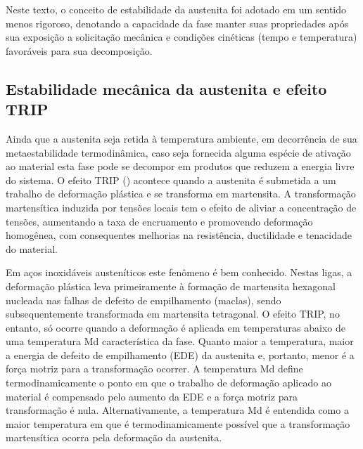 Neste texto, o conceito de estabilidade da austenita foi adotado em um sentido menos rigoroso, denotando a capacidade da fase manter suas propriedades após sua exposição a solicitação mecânica e condições cinéticas (tempo e temperatura) favoráveis para sua decomposição.


\subsection{Estabilidade mecânica da austenita e efeito TRIP}

\label{subsec:TRIP}

Ainda que a austenita seja retida à temperatura ambiente, em decorrência de sua metaestabilidade termodinâmica, caso seja fornecida alguma espécie de ativação ao material esta fase pode se decompor em produtos que reduzem a energia livre do sistema. O efeito TRIP () acontece quando a austenita é submetida a um trabalho de deformação plástica e se transforma em martensita. A transformação martensítica induzida por tensões locais tem o efeito de aliviar a concentração de tensões, aumentando a taxa de encruamento e promovendo deformação homogênea, com consequentes melhorias na resistência, ductilidade e tenacidade do material\cite{Honeycombe2006}.


Em aços inoxidáveis austeníticos este fenômeno é bem conhecido. %
Nestas ligas, a deformação plástica leva primeiramente à formação de martensita hexagonal nucleada nas falhas de defeito de empilhamento (maclas), sendo subsequentemente transformada em martensita tetragonal\cite{Honeycombe2006}. O efeito TRIP, no entanto, só ocorre quando a deformação é aplicada em temperaturas abaixo de uma temperatura Md característica da fase. Quanto maior a temperatura, maior a energia de defeito de empilhamento (EDE) da austenita e, portanto, menor é a força motriz para a transformação ocorrer. A temperatura Md define termodinamicamente o ponto em que o trabalho de deformação aplicado ao material é compensado pelo aumento da EDE\cite{DeCooman2004} e a força motriz para transformação é nula. Alternativamente, a temperatura Md é entendida como a maior temperatura em que é termodinamicamente possível que a transformação martensítica ocorra pela deformação da austenita.


